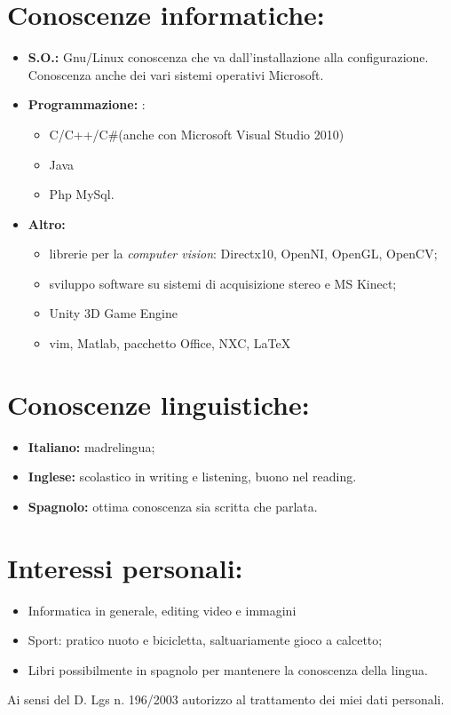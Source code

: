 \documentclass[pdftex,a4paper,12pt,twoside,titlepage,italian,openright]{article}
\begin{document}
\section*{Conoscenze informatiche:}
\begin{itemize}
	\item \textbf{S.O.:} Gnu/Linux conoscenza 	che va dall'installazione alla configurazione. Conoscenza anche dei vari 
	sistemi operativi Microsoft.
	\item \textbf{Programmazione: }:
	\begin{itemize}
	\item C/C++/C\#(anche con Microsoft Visual Studio 2010)
	\item Java
	\item Php MySql.
	\end{itemize}
	\item \textbf{Altro: }
	\begin{itemize}
	\item librerie per la {\itshape computer vision}: Directx10, OpenNI, OpenGL, OpenCV;
	\item sviluppo software su sistemi di acquisizione stereo e MS Kinect;
	\item Unity 3D Game Engine
	\item vim, Matlab, pacchetto Office, NXC, \LaTeX
	\end{itemize}
\end{itemize}
\section*{Conoscenze linguistiche:}
\begin{itemize}
	\item \textbf{Italiano:} madrelingua;
	\item \textbf{Inglese:} scolastico in writing e listening, buono nel reading.
	\item \textbf{Spagnolo:} ottima conoscenza sia scritta che parlata.
\end{itemize}
\section*{Interessi personali: }
\begin{itemize}
	\item Informatica in generale, editing video e immagini
	\item Sport: pratico nuoto e bicicletta, saltuariamente gioco a calcetto;
	\item Libri possibilmente in spagnolo per mantenere la conoscenza della lingua.
\end{itemize}
\vfill
Ai sensi del D. Lgs n. 196/2003 autorizzo al trattamento dei miei dati personali.
\vspace{1cm}
\end{document}
